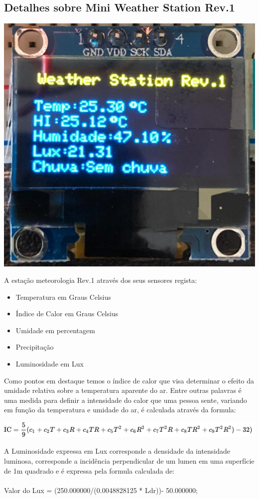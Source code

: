 \documentclass[12pt,a4paper,portrait]{article}
\begin{document}
			\subsection{Detalhes sobre Mini Weather Station Rev.1}
			\begin{center}
				\includegraphics[scale=0.3]{./img/display_info.jpeg}
			\end{center}
			A estação meteorologia Rev.1 através dos seus sensores regista:
			\begin{itemize}
				\item Temperatura em Graus Celsius
				\item Índice de Calor em Graus Celsius
				\item Umidade em percentagem
				\item Precipitação
				\item Luminosidade em Lux
			\end{itemize}
		Como pontos em destaque temos o índice de calor que visa determinar o efeito da umidade relativa sobre a temperatura aparente do ar. Entre outras palavras é uma medida para definir a intensidade do calor que uma pessoa sente, variando em função da temperatura e umidade do ar, é calculada através da formula:\\
		\begin{center}
			\includegraphics[scale=0.9]{./img/hi.png}
		\end{center}
		A Luminosidade expressa em Lux corresponde a densidade da intensidade luminosa, corresponde a incidência perpendicular de um lumen em uma superfície de 1m quadrado e é expressa pela formula calculada de:\\\\
		Valor do Lux = (250.000000/(0.0048828125 * Ldr))- 50.000000;\\
		
\end{document}
